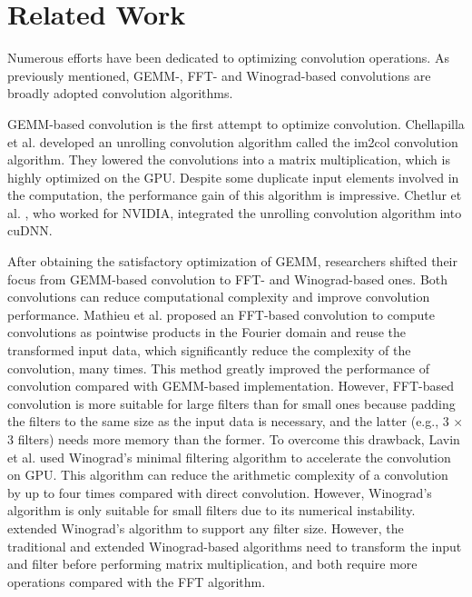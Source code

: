 \section{Related Work}
Numerous efforts have been dedicated to optimizing convolution operations. As previously mentioned, GEMM-, FFT- and
Winograd-based convolutions are broadly adopted convolution algorithms.

GEMM-based convolution is the first attempt to optimize convolution. Chellapilla et al. \cite{Chellapilla2006High} developed an unrolling
convolution algorithm  called the im2col convolution algorithm. They lowered the convolutions into a matrix multiplication, which is
highly optimized on the GPU. Despite some duplicate input elements involved in the computation, the performance gain of this algorithm is impressive. Chetlur et al. \cite{ChetlurWVCTCS14}, who worked for NVIDIA, integrated the unrolling convolution algorithm into cuDNN.

After obtaining the satisfactory optimization of GEMM, researchers shifted their focus from GEMM-based convolution to FFT- and
Winograd-based ones. Both convolutions can reduce computational complexity and improve convolution performance. Mathieu et al. \cite{mathieu2013fast} proposed an FFT-based convolution to compute convolutions as pointwise
products in the Fourier domain and reuse the transformed input data, which significantly reduce the complexity of the convolution, many times. This
method greatly improved the performance of convolution compared with GEMM-based implementation. However, FFT-based convolution is more suitable for large filters than for small ones because padding the filters to the same size as the input data is necessary, and  the latter (e.g., 3 × 3 filters) needs more memory than the former. To overcome this drawback, Lavin et al. \cite{lavin2016fast} used Winograd’s minimal filtering algorithm to
accelerate the convolution on GPU. This algorithm can reduce the arithmetic complexity of a convolution by up to four times compared with
direct convolution. However, Winograd's algorithm is only suitable for small filters due to its numerical instability. \cite{Zhen2018Optimizing}
extended Winograd's algorithm to support any filter size. However, the traditional and extended Winograd-based algorithms need to transform the input and filter before
performing matrix multiplication, and both require more operations compared with the FFT algorithm.

